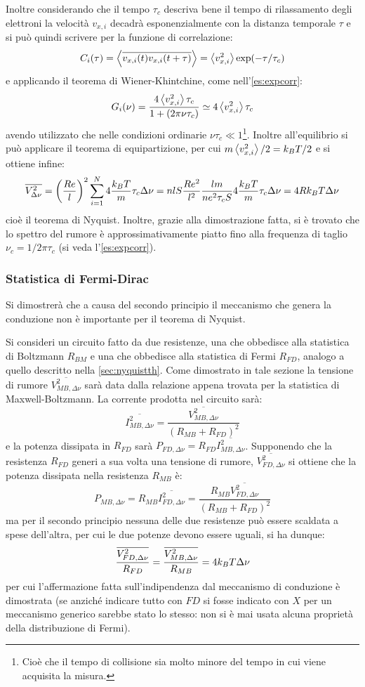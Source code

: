 Inoltre considerando che il tempo $ \tau_c $ descriva bene il tempo di rilassamento degli elettroni la  velocità $ v_{x,i} $ decadrà esponenzialmente con la distanza temporale $ \tau $ e si può quindi scrivere per la funzione di correlazione:
\[ C_i(\tau) = \expval{\overline{v_{x,i}(t) v_{x,i}(t + \tau)}} = \expval{v_{x,i}^2} \exp(-\tau/\tau_c) \]
e applicando il teorema di Wiener-Khintchine, come nell'\cref{es:expcorr}:
\[ G_i(\nu) = \frac{4\expval{v_{x,i}^2}\tau_c}{1 + (2\pi \nu \tau_c)} \simeq 4\expval{v_{x,i}^2}\tau_c \]
avendo utilizzato che nelle condizioni ordinarie $ \nu \tau_c \ll 1 $\footnote{Cioè che il tempo di collisione sia molto minore del tempo in cui viene acquisita la misura.}.
Inoltre all'equilibrio si può applicare il teorema di equipartizione, per cui $ m\expval{v_{x,i}^2}/2 = k_B T/2 $ e si ottiene infine:
\[ \overline{V_{\Delta \nu}^2} = \left(\frac{R e}{l}\right)^2 \sum_{i=1}^{N} 4\frac{k_B T}{m}\tau_c \Delta \nu = n l S \frac{R e^2}{l^2} \frac{lm}{ne^2 \tau_c S} 4\frac{k_B T}{m}\tau_c \Delta \nu = 4 R k_B T \Delta \nu \]
cioè il teorema di Nyquist. Inoltre, grazie alla dimostrazione fatta, si è trovato che lo spettro del rumore è approssimativamente piatto fino alla frequenza di taglio $ \nu_c = 1/2\pi\tau_c $ (si veda l'\cref{es:expcorr}).

\subsubsection{Statistica di Fermi-Dirac}

Si dimostrerà che a causa del secondo principio il meccanismo che genera la conduzione non è importante per il teorema di Nyquist.

Si consideri un circuito fatto da due resistenze, una che obbedisce alla statistica di Boltzmann $ R_{BM} $ e una che obbedisce alla statistica di Fermi $ R_{FD} $, analogo a quello descritto nella \cref{sec:nyquistth}.
Come dimostrato in tale sezione la tensione di rumore $\overline{V_{MB,\Delta\nu}^2}$ sarà data dalla relazione appena trovata per la statistica di Maxwell-Boltzmann. La corrente prodotta nel circuito sarà:
\[ \overline{I_{MB,\Delta\nu}^2} = \frac{\overline{V_{MB,\Delta\nu}^2}}{(R_{MB} + R_{FD})^2}\]
e la potenza dissipata in $ R_{FD} $ sarà $ P_{FD,\Delta\nu} = R_{FD} \overline{I_{MB,\Delta\nu}^2}$.
Supponendo che la resistenza $ R_{FD} $ generi a sua volta una tensione di rumore, $ \overline{V_{FD,\Delta\nu}^2} $ si ottiene che la potenza dissipata nella resistenza $ R_{MB} $ è:
\[ P_{MB,\Delta\nu} = R_{MB} \overline{I_{FD,\Delta\nu}^2} = \frac{R_{MB} \overline{V_{FD,\Delta\nu}^2}}{(R_{MB} + R_{FD})^2}\]
ma per il secondo principio nessuna delle due resistenze può essere scaldata a spese dell'altra, per cui le due potenze devono essere uguali, si ha dunque:
\[ \frac{\overline{V_{FD,\Delta\nu}^2} }{R_{FD}} = \frac{\overline{V_{MB,\Delta\nu}^2} }{R_{MB}} =  4 k_B T \Delta\nu\]
per cui l'affermazione fatta sull'indipendenza dal meccanismo di conduzione è dimostrata (se anziché indicare tutto con $ FD $ si fosse indicato con $ X $ per un meccanismo generico sarebbe stato lo stesso: non si è mai usata alcuna proprietà della distribuzione di Fermi).


